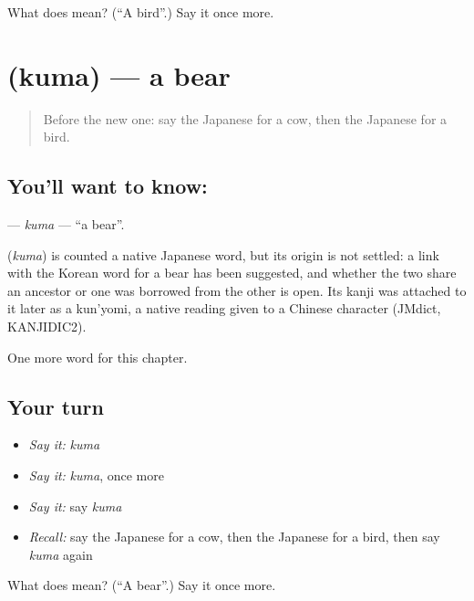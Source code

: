 \begin{tcolorbox}[breakable,colback=teal!4,colframe=teal!35!black,title={Before you move on}]
What does  mean? (\textquotedblleft{}A bird\textquotedblright{}.) Say it once more.
\end{tcolorbox}
\section[\texorpdfstring{\ja{くま} (kuma)}{くま (kuma)}]{ (kuma) — a bear}

\label{lesson:JA-C45-kuma}



\begin{quote}
Before the new one: say the Japanese for a cow, then the Japanese for a bird.
\end{quote}

\subsection*{You'll want to know: }
\textbf{} — \emph{kuma} — \textquotedblleft{}a bear\textquotedblright{}.

\begin{cousinweb}
\textbf{} (\emph{kuma}) is counted a native Japanese word, but its origin is not settled: a link with the Korean word for a bear has been suggested, and whether the two share an ancestor or one was borrowed from the other is open. Its kanji was attached to it later as a kun'yomi, a native reading given to a Chinese character (JMdict, KANJIDIC2).
\end{cousinweb}

\begin{grammarlens}[title={What you've built}]
One more word for this chapter.
\end{grammarlens}

\subsection*{Your turn}
\begin{itemize}
\raggedright
  \item \emph{Say it:} \emph{kuma}
  \item \emph{Say it:} \emph{kuma}, once more
  \item \emph{Say it:} say \emph{kuma}
  \item \emph{Recall:} say the Japanese for a cow, then the Japanese for a bird, then say \emph{kuma} again
\end{itemize}

\begin{tcolorbox}[breakable,colback=teal!4,colframe=teal!35!black,title={Before you move on}]
What does  mean? (\textquotedblleft{}A bear\textquotedblright{}.) Say it once more.
\end{tcolorbox}
